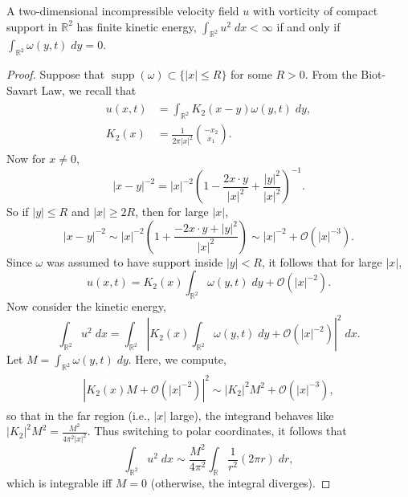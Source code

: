 \documentclass{article}
\begin{document}
\begin{prop}
	A two-dimensional incompressible velocity field $u$ with vorticity of compact support in $\mathbb{R}^{2}$ has finite kinetic energy, $\int_{\mathbb{R}^{2}}u^{2}\;dx < \infty$ if and only if $\int_{\mathbb{R}^{2}}\omega(y,t)\;dy = 0$. 
\end{prop} 
\begin{proof}
	Suppose that $\operatorname{supp}(\omega) \subset \{|x| \leq R\}$ for some $R > 0$. From the Biot-Savart Law, we recall that 
	\begin{align*}
		\begin{split}
			u(x, t) &= \int_{\mathbb{R}^{2}}K_{2}(x - y)\omega(y, t)\;dy, \\
			K_{2}(x) & = \frac{1}{2\pi|x|^{2}}\binom{-x_{2}}{x_{1}}. 
		\end{split} 
	\end{align*} 
	Now for $x \neq 0$, 
	\begin{equation*}
		|x - y|^{-2} = |x|^{-2}\left(1 - \frac{2x \cdot y}{|x|^{2}} + \frac{|y|^{2}}{|x|^{2}}\right)^{-1}. 
	\end{equation*} 
	So if $|y| \leq R$ and $|x| \geq 2R$, then for large $|x|$, 
	\begin{equation*}
		|x - y|^{-2} \sim |x|^{-2}\left(1 + \frac{-2x \cdot y + |y|^{2}}{|x|^{2}}\right) \sim |x|^{-2} + \mathcal{O}(|x|^{-3}). 
	\end{equation*} 
	Since $\omega$ was assumed to have support inside $|y| < R$, it follows that for large $|x|$, 
	\begin{equation*}
		u(x, t) = K_{2}(x)\int_{\mathbb{R}^{2}}\omega(y,t)\;dy + \mathcal{O}(|x|^{-2}). 
	\end{equation*}
	Now consider the kinetic energy, 
	\begin{equation*}
		\int_{\mathbb{R}^{2}}u^{2}\;dx = \int_{\mathbb{R}^{2}}\left|K_{2}(x)\int_{\mathbb{R}^{2}}\omega(y,t)\;dy + \mathcal{O}(|x|^{-2})\right|^{2}\;dx. 
	\end{equation*} 
	Let $M = \int_{\mathbb{R}^{2}}\omega(y, t)\;dy$. Here, we compute, 
	\begin{align*}
		\begin{split}
			\left|K_{2}(x) M + \mathcal{O}(|x|^{-2})\right|^{2} \sim |K_{2}|^{2}M^{2} + \mathcal{O}(|x|^{-3}), 
		\end{split} 
	\end{align*} 
	so that in the far region (i.e., $|x|$ large), the integrand behaves like $|K_{2}|^{2}M^{2} = \frac{M^{2}}{4\pi^{2}|x|^{2}}$. Thus switching to polar coordinates, it follows that 
	\begin{equation*}
		\int_{\mathbb{R}^{2}}u^{2}\;dx \sim \frac{M^{2}}{4\pi^{2}}\int_{\mathbb{R}}\frac{1}{r^{2}}(2\pi r)\;dr, 
	\end{equation*} 
	which is integrable iff $M = 0$ (otherwise, the integral diverges). 
	
\end{proof} 
\end{document}
